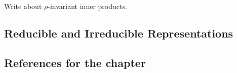 \documentclass[11pt]{article}
\begin{document}
\vskip 0.5cm
Write about $\rho$-invariant inner products.

\vskip 1cm
\subsection{Reducible and Irreducible Representations}




\vskip 1cm
\subsection*{References for the chapter}








\end{document}

